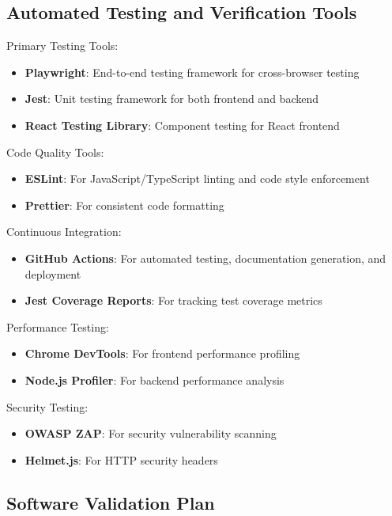 \documentclass[12pt, titlepage]{article}
\begin{document}
\subsection{Automated Testing and Verification Tools}

\noindent Primary Testing Tools:
\begin{itemize}
    \item \textbf{Playwright}: End-to-end testing framework for cross-browser testing
    \item \textbf{Jest}: Unit testing framework for both frontend and backend
    \item \textbf{React Testing Library}: Component testing for React frontend
\end{itemize}

\noindent Code Quality Tools:
\begin{itemize}
    \item \textbf{ESLint}: For JavaScript/TypeScript linting and code style enforcement
    \item \textbf{Prettier}: For consistent code formatting
\end{itemize}

\noindent Continuous Integration:
\begin{itemize}
    \item \textbf{GitHub Actions}: For automated testing, documentation generation, and deployment
    \item \textbf{Jest Coverage Reports}: For tracking test coverage metrics
\end{itemize}

\noindent Performance Testing:
\begin{itemize}
    \item \textbf{Chrome DevTools}: For frontend performance profiling
    \item \textbf{Node.js Profiler}: For backend performance analysis
\end{itemize}

\noindent Security Testing:
\begin{itemize}
    \item \textbf{OWASP ZAP}: For security vulnerability scanning
    \item \textbf{Helmet.js}: For HTTP security headers
\end{itemize}

\subsection{Software Validation Plan}
\end{document}
